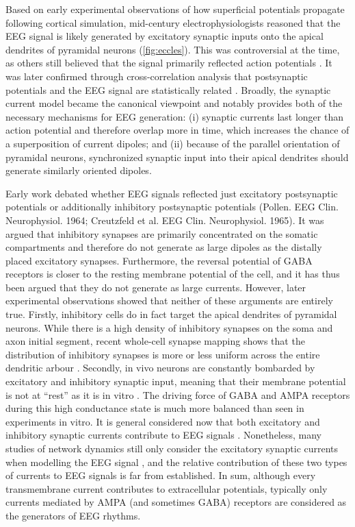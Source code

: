 Based on early experimental observations of how superficial potentials propagate following cortical simulation, mid-century electrophysiologists \cite{Eccles1951} reasoned that the EEG signal is likely generated by excitatory synaptic inputs onto the apical dendrites of pyramidal neurons (\autoref{fig:eccles}). This was controversial at the time, as others still believed that the signal primarily reflected action potentials \cite{Burns1950}. It was later confirmed through cross-correlation analysis that postsynaptic potentials and the EEG signal are statistically related \cite{KLEE1965}. Broadly, the synaptic current model became the canonical viewpoint and notably provides both of the necessary mechanisms for EEG generation: (i) synaptic currents last longer than action potential and therefore overlap more in time, which increases the chance of a superposition of current dipoles; and (ii) because of the parallel orientation of pyramidal neurons, synchronized synaptic input into their apical dendrites should generate similarly oriented dipoles.

Early work debated whether EEG signals reflected just excitatory postsynaptic potentials or additionally inhibitory postsynaptic potentials (Pollen. EEG Clin. Neurophysiol. 1964; Creutzfeld et al. EEG Clin. Neurophysiol. 1965). It was argued that inhibitory synapses are primarily concentrated on the somatic compartments and therefore do not generate as large dipoles as the distally placed excitatory synapses. Furthermore, the reversal potential of GABA receptors is closer to the resting membrane potential of the cell, and it has thus been argued that they do not generate as large currents. However, later experimental observations showed that neither of these arguments are entirely true. Firstly, inhibitory cells do in fact target the apical dendrites of pyramidal neurons. While there is a high density of inhibitory synapses on the soma and axon initial segment, recent whole-cell synapse mapping shows that the distribution of inhibitory synapses is more or less uniform across the entire dendritic arbour \cite{Iacaruso2017}. Secondly, in vivo neurons are constantly bombarded by excitatory and inhibitory synaptic input, meaning that their membrane potential is not at ``rest'' as it is in vitro \cite{Destexhe2003}. The driving force of GABA and AMPA receptors during this high conductance state is much more balanced than seen in experiments in vitro. It is general considered now that both excitatory and inhibitory synaptic currents contribute to EEG signals \cite{Buzsaki2012}. Nonetheless, many studies of network dynamics still only consider the excitatory synaptic currents when modelling the EEG signal \cite{Jensen2005,McCarthy2008}, and the relative contribution of these two types of currents to EEG signals is far from established. In sum, although every transmembrane current contributes to extracellular potentials, typically only currents mediated by AMPA (and sometimes GABA) receptors are considered as the generators of EEG rhythms.


